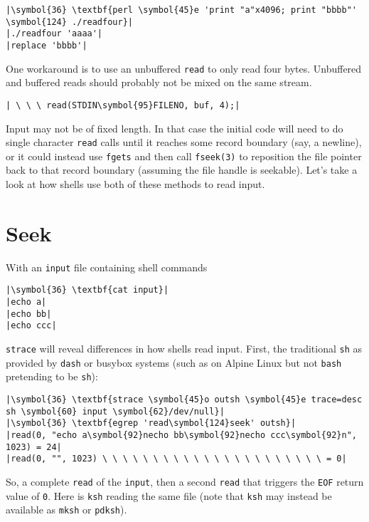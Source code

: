 \documentclass[10pt,a4paper]{article}
\begin{document}
\begin{lstlisting}
|\symbol{36} \textbf{perl \symbol{45}e 'print "a"x4096; print "bbbb"' \symbol{124} ./readfour}|
|./readfour 'aaaa'|
|replace 'bbbb'|
\end{lstlisting}

One workaround is to use an unbuffered \texttt{read} to only read four
bytes. Unbuffered and buffered reads should probably not be mixed on the
same stream.

\begin{lstlisting}
| \ \ \ read(STDIN\symbol{95}FILENO, buf, 4);|
\end{lstlisting}

Input may not be of fixed length. In that case the initial code will
need to do single character \texttt{read} calls until it reaches some
record boundary (say, a newline), or it could instead use \texttt{fgets}
and then call \texttt{fseek(3)} to reposition the file pointer back to
that record boundary (assuming the file handle is seekable). Let's take
a look at how shells use both of these methods to read input.

\section*{Seek}

With an \texttt{input} file containing shell commands

\begin{lstlisting}
|\symbol{36} \textbf{cat input}|
|echo a|
|echo bb|
|echo ccc|
\end{lstlisting}

\texttt{strace} will reveal differences in how shells read input. First,
the traditional \texttt{sh} as provided by \texttt{dash} or busybox
systems (such as on Alpine Linux but not \texttt{bash} pretending to be
\texttt{sh}):

\begin{lstlisting}
|\symbol{36} \textbf{strace \symbol{45}o outsh \symbol{45}e trace=desc sh \symbol{60} input \symbol{62}/dev/null}|
|\symbol{36} \textbf{egrep 'read\symbol{124}seek' outsh}|
|read(0, "echo a\symbol{92}necho bb\symbol{92}necho ccc\symbol{92}n", 1023) = 24|
|read(0, "", 1023) \ \ \ \ \ \ \ \ \ \ \ \ \ \ \ \ \ \ \ \ \ \ = 0|
\end{lstlisting}

So, a complete \texttt{read} of the \texttt{input}, then a second
\texttt{read} that triggers the \texttt{EOF} return value of \texttt{0}.
Here is \texttt{ksh} reading the same file (note that \texttt{ksh} may
instead be available as \texttt{mksh} or \texttt{pdksh}).
\end{document}
